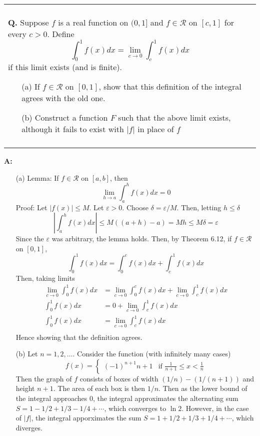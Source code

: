 \documentclass{article}
\newenvironment{myboxed}{\noindent\begin{tabular}{|p{.975\linewidth}|}\hline \\}{\\\\\hline\end{tabular}}
\newcounter{Question}
\newenvironment{Question} 
{\bigskip\begin{myboxed}\refstepcounter{Question}\par\noindent\textbf{Q\theQuestion.}}
{\end{myboxed}\bigskip}
\newenvironment{Answer} {\par\noindent\textbf{A:}} {}
\begin{document}
\newpage
\begin{Question}
    Suppose $f$ is a real function on $(0, 1]$ and $f \in \mathscr{R}$ on $[c,1]$ for every $c > 0$. Define
    \[\int_0^1 f(x) dx = \lim_{c\to 0} \int_c^1 f(x)dx\]
    if this limit exists (and is finite).
    \begin{itemize}
        \item[(a)] If $f \in \mathscr{R}$ on $[0, 1]$, show that this definition of the integral agrees with the old one.
        \item[(b)] Construct a function $F$ such that the above limit exists, although it fails to exist with $|f|$ in place of $f$
    \end{itemize}
\end{Question}
\begin{Answer}
    \begin{itemize}
        \item[(a)]
            Lemma: If $f \in \mathscr{R}$ on $[a ,b]$, then
            \[\lim_{h \to a} \int_a^h f(x)dx = 0\]
            Proof: Let $|f(x)| \leq M$. Let $\varepsilon > 0$. Choose $\delta = \varepsilon/M$. Then, letting $h \leq \delta$
            \[\left|\int_a^h f(x) dx\right| \leq M((a+h) - a) = Mh \leq M\delta = \varepsilon\]
            Since the $\varepsilon$ was arbitrary, the lemma holds.
            Then, by Theorem 6.12, if $f \in \mathscr{R}$ on $[0, 1]$,
            \[\int_0^1 f(x)dx = \int_0^c f(x)dx + \int_c^1 f(x)dx\]
            Then, taking limits
            \begin{align*}
                \lim_{c \to 0} \int_0^1 f(x)dx &= \lim_{c \to 0}\int_0^c f(x)dx + \lim_{c \to 0}\int_c^1 f(x)dx \\
                \int_0^1 f(x)dx &= 0 + \lim_{c \to 0}\int_c^1 f(x)dx \\
                \int_0^1 f(x)dx &= \lim_{c \to 0}\int_c^1 f(x)dx \\
            \end{align*}
            Hence showing that the definition agrees.
        \item[(b)]
            Let $n = 1, 2, \ldots$. Consider the function (with infinitely many cases)
            \[f(x) = \begin{cases}
                (-1)^{n+1}n+1 & \text{if } \frac{1}{n+1} \leq x < \frac{1}{n}
            \end{cases}\]
            Then the graph of $f$ consists of boxes of width $(1/n) - (1/(n+1))$ and height $n+1$. The area of each box is then $1/n$. Then as the lower bound of the integral approaches $0$, the integral approximates the alternating sum $S = 1 - 1/2 + 1/3 - 1/4 + \cdots$, which converges to $\ln 2$.
            However, in the case of $|f|$, the integral apporximates the sum $S = 1 + 1/2 + 1/3 + 1/4 + \cdots$, which diverges.
    \end{itemize}
\end{Answer}
\end{document}
